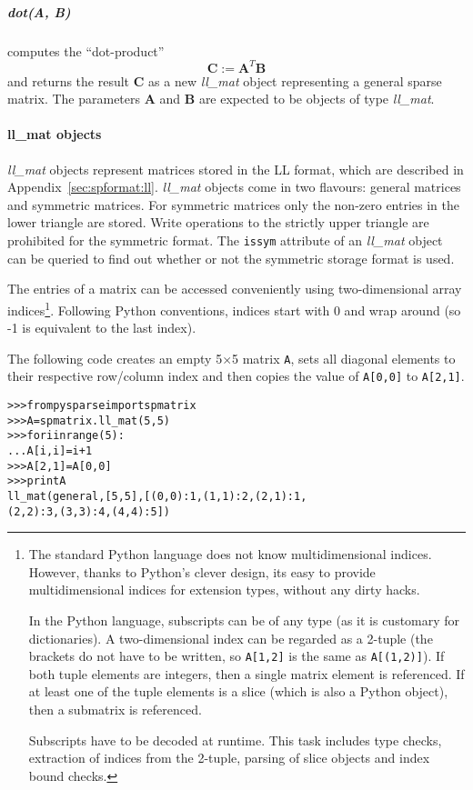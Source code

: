\documentclass[a4paper]{article}
\newcommand{\mat}[1]{\ensuremath{\boldsymbol{#1}}}
\newlength{\pyindent} \newlength{\pyminipagewidth}
\newenvironment{pyinline}{\begin{trivlist}\item\hspace*{\pyindent}\begin{minipage}{\pyminipagewidth}\small\begin{alltt}}
      {\end{alltt}\end{minipage}\end{trivlist}}
\begin{document}
\subparagraph{dot(A, B)}
%
computes the ``dot-product''
\begin{equation*}
  \mat{C} := \mat{A}^T\mat{B}
\end{equation*}
and returns the result $\mat{C}$ as a new \textit{ll\_mat} object
representing a general sparse matrix. The parameters $\mat{A}$ and
$\mat{B}$ are expected to be objects of type \textit{ll\_mat}.

\paragraph{ll\_mat objects}
%
\textit{ll\_mat} objects represent matrices stored in the LL format,
which are described in Appendix~\ref{sec:spformat:ll}.
\textit{ll\_mat} objects come in two flavours: general matrices and
symmetric matrices.  For symmetric matrices only the non-zero entries
in the lower triangle are stored.  Write operations to the strictly
upper triangle are prohibited for the symmetric format.  The
\texttt{issym} attribute of an \textit{ll\_mat} object can be queried
to find out whether or not the symmetric storage format is used.

The entries of a matrix can be accessed conveniently using
two-dimensional array indices\footnote{The standard Python language
  does not know multidimensional indices.  However, thanks to Python's
  clever design, its easy to provide multidimensional indices for
  extension types, without any dirty hacks.
  
  In the Python language, subscripts can be of any type (as it is
  customary for dictionaries). A two-dimensional index can be regarded
  as a 2-tuple (the brackets do not have to be written, so
  \texttt{A[1,2]} is the same as \texttt{A[(1,2)]}). If both tuple
  elements are integers, then a single matrix element is referenced.
  If at least one of the tuple elements is a slice (which is also a
  Python object), then a submatrix is referenced.

Subscripts have to be decoded at runtime. This task includes type
checks, extraction of indices from the 2-tuple, parsing of slice
objects and index bound checks. }.  Following Python conventions,
indices start with 0 and wrap around (so -1 is equivalent to the last
index).

The following code creates an empty 5$\times$5 matrix \texttt{A}, sets
all diagonal elements to their respective row/column index and then
copies the value of \texttt{A[0,0]} to \texttt{A[2,1]}.
\begin{pyinline}
>>> from pysparse import spmatrix
>>> A = spmatrix.ll_mat(5, 5)
>>> for i in range(5):
...     A[i,i] = i+1
>>> A[2,1] = A[0,0]
>>> print A
ll_mat(general, [5,5], [(0,0): 1, (1,1): 2, (2,1): 1,
(2,2): 3, (3,3): 4, (4,4): 5])
\end{pyinline}
\end{document}
